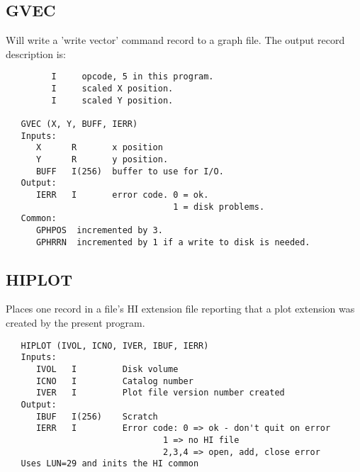\subsection{GVEC}
Will write a 'write vector' command record to a graph file.
The output record description is:
\begin{verbatim}
         I     opcode, 5 in this program.
         I     scaled X position.
         I     scaled Y position.

   GVEC (X, Y, BUFF, IERR)
   Inputs:
      X      R       x position
      Y      R       y position.
      BUFF   I(256)  buffer to use for I/O.
   Output:
      IERR   I       error code. 0 = ok.
                                 1 = disk problems.
   Common:
      GPHPOS  incremented by 3.
      GPHRRN  incremented by 1 if a write to disk is needed.

\end{verbatim}

\subsection{HIPLOT}
Places one record in a file's HI extension file reporting
that a plot extension was created by the present program.
\begin{verbatim}
   HIPLOT (IVOL, ICNO, IVER, IBUF, IERR)
   Inputs:
      IVOL   I         Disk volume
      ICNO   I         Catalog number
      IVER   I         Plot file version number created
   Output:
      IBUF   I(256)    Scratch
      IERR   I         Error code: 0 => ok - don't quit on error
                               1 => no HI file
                               2,3,4 => open, add, close error
   Uses LUN=29 and inits the HI common

\end{verbatim}

